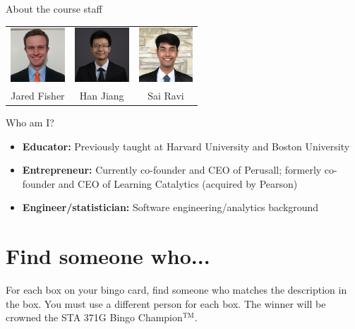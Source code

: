 \documentclass{beamer}\usepackage[]{graphicx}\usepackage[]{color}
\begin{document}
\begin{darkframes}
\begin{frame}{About the course staff}
\begin{itemize}
          \vspace{0.2in}
          \begin{tabular}{ccc}
            \includegraphics[width=0.8in]{jared} &
            \includegraphics[width=0.8in]{han} &
            \includegraphics[width=0.8in]{sai} \\
            Jared Fisher & Han Jiang & Sai Ravi \\
          \end{tabular}
      \end{itemize}
    \end{frame}

    \begin{frame}{Who am I?}
      \begin{itemize}
        \item \textbf{Educator:} Previously taught at Harvard University and Boston University
        \item \textbf{Entrepreneur:} Currently co-founder and CEO of Perusall; formerly co-founder and CEO of Learning Catalytics (acquired by Pearson)
        \item \textbf{Engineer/statistician:} Software engineering/analytics background
      \end{itemize}
    \end{frame}

    \section{Find someone who...}

    \begin{frame}{}
      \begin{center}
        For each box on your bingo card, find someone who matches the description in the box. You must use a different person for each box.
        \vfill
        The winner will be crowned the STA 371G Bingo Champion$^{\text{TM}}$.
      \end{center}
    \end{frame}


\end{darkframes}
\end{document}
